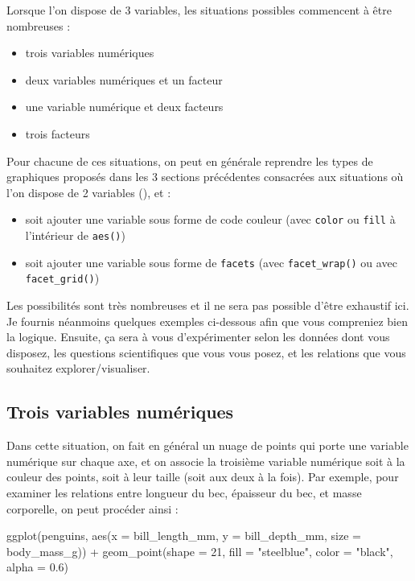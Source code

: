 \documentclass[
  a4paper,
  DIV=11,
  numbers=noendperiod,
  oneside]{scrreprt}
\newenvironment{Shaded}{}{}
\newcommand{\AttributeTok}[1]{\textcolor[rgb]{0.84,0.23,0.29}{#1}}
\newcommand{\DecValTok}[1]{\textcolor[rgb]{0.00,0.36,0.77}{#1}}
\newcommand{\FloatTok}[1]{\textcolor[rgb]{0.00,0.36,0.77}{#1}}
\newcommand{\FunctionTok}[1]{\textcolor[rgb]{0.44,0.26,0.76}{#1}}
\newcommand{\NormalTok}[1]{\textcolor[rgb]{0.14,0.16,0.18}{#1}}
\newcommand{\SpecialCharTok}[1]{\textcolor[rgb]{0.00,0.36,0.77}{#1}}
\newcommand{\StringTok}[1]{\textcolor[rgb]{0.01,0.18,0.38}{#1}}
\providecommand{\tightlist}{%
  \setlength{\itemsep}{0pt}\setlength{\parskip}{0pt}}\usepackage{longtable,booktabs,array}
\begin{document}
Lorsque l'on dispose de 3 variables, les situations possibles commencent
à être nombreuses :

\begin{itemize}
\tightlist
\item
  trois variables numériques
\item
  deux variables numériques et un facteur
\item
  une variable numérique et deux facteurs
\item
  trois facteurs
\end{itemize}

Pour chacune de ces situations, on peut en générale reprendre les types
de graphiques proposés dans les 3 sections précédentes consacrées aux
situations où l'on dispose de 2 variables (), et :

\begin{itemize}
\tightlist
\item
  soit ajouter une variable sous forme de code couleur (avec
  \texttt{color} ou \texttt{fill} à l'intérieur de \texttt{aes()})
\item
  soit ajouter une variable sous forme de \texttt{facets} (avec
  \texttt{facet\_wrap()} ou avec \texttt{facet\_grid()})
\end{itemize}

Les possibilités sont très nombreuses et il ne sera pas possible d'être
exhaustif ici. Je fournis néanmoins quelques exemples ci-dessous afin
que vous compreniez bien la logique. Ensuite, ça sera à vous
d'expérimenter selon les données dont vous disposez, les questions
scientifiques que vous vous posez, et les relations que vous souhaitez
explorer/visualiser.

\subsection{Trois variables
numériques}\label{trois-variables-numuxe9riques}

Dans cette situation, on fait en général un nuage de points qui porte
une variable numérique sur chaque axe, et on associe la troisième
variable numérique soit à la couleur des points, soit à leur taille
(soit aux deux à la fois). Par exemple, pour examiner les relations
entre longueur du bec, épaisseur du bec, et masse corporelle, on peut
procéder ainsi :

\begin{Shaded}
\begin{Highlighting}[]
\FunctionTok{ggplot}\NormalTok{(penguins, }\FunctionTok{aes}\NormalTok{(}\AttributeTok{x =}\NormalTok{ bill\_length\_mm, }\AttributeTok{y =}\NormalTok{ bill\_depth\_mm,}
                     \AttributeTok{size =}\NormalTok{ body\_mass\_g)) }\SpecialCharTok{+}
  \FunctionTok{geom\_point}\NormalTok{(}\AttributeTok{shape =} \DecValTok{21}\NormalTok{, }\AttributeTok{fill =} \StringTok{"steelblue"}\NormalTok{, }\AttributeTok{color =} \StringTok{"black"}\NormalTok{, }\AttributeTok{alpha =} \FloatTok{0.6}\NormalTok{)}
\end{Highlighting}
\end{Shaded}
\end{document}
